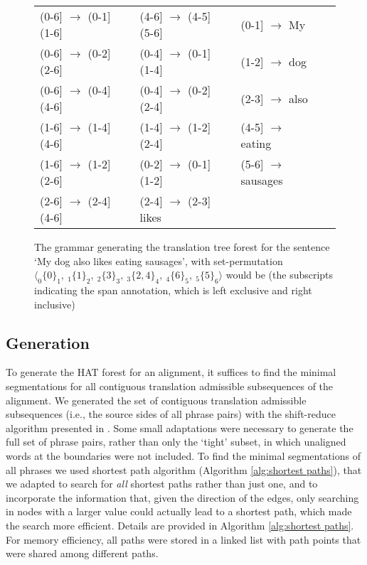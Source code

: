 \documentclass[hidelinks]{report}
\begin{document}
\begin{figure}\begin{framed}
\small{
\begin{tabular}{llllll}
(0-6] $\rightarrow$ (0-1]  (1-6] && (4-6] $\rightarrow$ (4-5]  (5-6] && (0-1] $\rightarrow$ My\\
(0-6] $\rightarrow$ (0-2]  (2-6] && (0-4] $\rightarrow$ (0-1]  (1-4] && (1-2] $\rightarrow$ dog\\
(0-6] $\rightarrow$ (0-4]  (4-6] && (0-4] $\rightarrow$ (0-2]  (2-4] && (2-3] $\rightarrow$ also\\
(1-6] $\rightarrow$ (1-4]  (4-6] && (1-4] $\rightarrow$ (1-2]  (2-4] && (4-5] $\rightarrow$ eating\\
(1-6] $\rightarrow$ (1-2]  (2-6] && (0-2] $\rightarrow$ (0-1]  (1-2] && (5-6] $\rightarrow$ sausages\\
(2-6] $\rightarrow$ (2-4]  (4-6] && (2-4] $\rightarrow$ (2-3] likes\\
\end{tabular}
\caption{The grammar generating the translation tree forest for the sentence
`My dog also likes eating sausages', with set-permutation $\langle _0\{0\}_1,~ _1\{1\}_2,~ _2\{3\}_3,~ _3\{2,4\}_4, ~_4\{6\}_5,~ _5\{5\}_6\rangle$ would be (the subscripts indicating the span annotation, which is left exclusive and right inclusive)}\label{fig:grammar}
}
\end{framed}
\end{figure}

\subsection{Generation}
To generate the HAT forest for an alignment, it suffices to find the minimal segmentations for all contiguous translation admissible subsequences of the alignment. We generated the set of contiguous translation admissible subsequences (i.e., the source sides of all phrase pairs) with the shift-reduce algorithm presented in \cite{zhang2008extracting}. Some small adaptations were necessary to generate the full set of phrase pairs, rather than only the `tight' subset, in which unaligned words at the boundaries were not included. To find the minimal segmentations of all phrases we used  shortest path algorithm (Algorithm \ref{alg:shortest paths}), that we adapted to search for \textit{all} shortest paths rather than just one, and to incorporate the information that, given the direction of the edges, only searching in nodes with a larger value could actually lead to a shortest path, which made the search more efficient. Details are provided in Algorithm \ref{alg:shortest paths}. For memory efficiency, all paths were stored in a linked list with path points that were shared among different paths.
\end{document}
